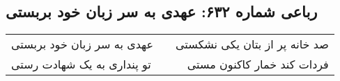 \begin{center}
\section*{رباعی شماره ۶۳۲: عهدی به سر زبان خود بربستی}
\label{sec:sh632}
\begin{longtable}{l p{0.5cm} r}
عهدی به سر زبان خود بربستی
&&
صد خانه پر از بتان یکی نشکستی
\\
تو پنداری به یک شهادت رستی
&&
فردات کند خمار کاکنون مستی
\\
\end{longtable}
\end{center}
